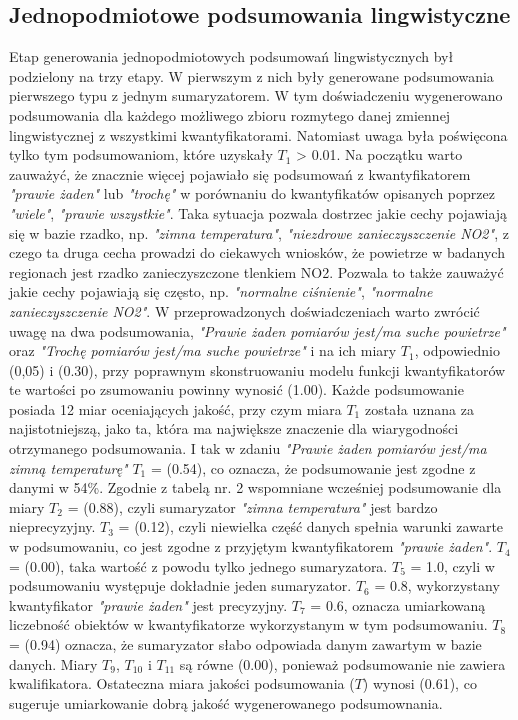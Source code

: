 \documentclass{article}
\begin{document}
\subsection{Jednopodmiotowe podsumowania lingwistyczne}
Etap generowania jednopodmiotowych podsumowań lingwistycznych był podzielony na trzy etapy. W pierwszym z nich były generowane podsumowania pierwszego typu z jednym sumaryzatorem. W tym doświadczeniu wygenerowano podsumowania dla każdego możliwego zbioru rozmytego danej zmiennej lingwistycznej z wszystkimi kwantyfikatorami. Natomiast uwaga była poświęcona tylko tym podsumowaniom, które uzyskały \(T_1\) > 0.01. Na początku warto zauważyć, że znacznie więcej pojawiało się podsumowań z kwantyfikatorem \textit{"prawie żaden"} lub \textit{"trochę"} w porównaniu do kwantyfikatów opisanych poprzez \textit{"wiele"}, \textit{"prawie wszystkie"}. Taka sytuacja pozwala dostrzec jakie cechy pojawiają się w bazie rzadko, np. \textit{"zimna temperatura"}, \textit{"niezdrowe zanieczyszczenie NO2"}, z czego ta druga cecha prowadzi do ciekawych wniosków, że powietrze w badanych regionach jest rzadko zanieczyszczone tlenkiem NO2. Pozwala to także zauważyć jakie cechy pojawiają się często, np. \textit{"normalne ciśnienie"}, \textit{"normalne zanieczyszczenie NO2"}. W przeprowadzonych doświadczeniach warto zwrócić uwagę na dwa podsumowania, \textit{"Prawie żaden pomiarów jest/ma suche powietrze"} oraz \textit{"Trochę pomiarów jest/ma suche powietrze"} i na ich miary \(T_1\), odpowiednio (0,05) i (0.30), przy poprawnym skonstruowaniu modelu funkcji kwantyfikatorów te wartości po zsumowaniu powinny wynosić (1.00). Każde podsumowanie posiada 12 miar oceniających jakość, przy czym miara \(T_1\) została uznana za najistotniejszą, jako ta, która ma największe znaczenie dla wiarygodności otrzymanego podsumowania. I tak w zdaniu \textit{"Prawie żaden pomiarów jest/ma zimną temperaturę"} \(T_1\) = (0.54), co oznacza, że podsumowanie jest zgodne z danymi w 54\%. Zgodnie z tabelą nr. 2 wspomniane wcześniej podsumowanie dla miary \(T_2\) = (0.88), czyli sumaryzator \textit{"zimna temperatura"} jest bardzo nieprecyzyjny. \(T_3\) = (0.12), czyli niewielka część danych spełnia warunki zawarte w podsumowaniu, co jest zgodne z przyjętym kwantyfikatorem \textit{"prawie żaden"}. \(T_4\) = (0.00), taka wartość z powodu tylko jednego sumaryzatora. \(T_5\) = 1.0, czyli w podsumowaniu występuje dokładnie jeden sumaryzator. \(T_6\) = 0.8, wykorzystany kwantyfikator \textit{"prawie żaden"} jest precyzyjny. \(T_7\) = 0.6, oznacza umiarkowaną liczebność obiektów w kwantyfikatorze wykorzystanym w tym podsumowaniu. \(T_8\) = (0.94) oznacza, że sumaryzator słabo odpowiada danym zawartym w bazie danych. Miary \(T_9\), \(T_{10}\) i \(T_{11}\) są równe (0.00), ponieważ podsumowanie nie zawiera kwalifikatora. Ostateczna miara jakości podsumowania (\(T\)) wynosi (0{.}61), co sugeruje umiarkowanie dobrą jakość wygenerowanego podsumownania. \\
\end{document}
